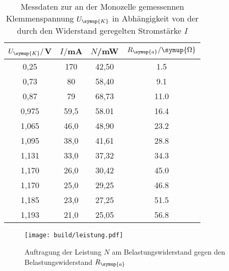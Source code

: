 \begin{table}
  \centering
  \caption{Messdaten zur an der Monozelle gemessennen Klemmenspannung $U_{\symup{K}}$
  in Abhängigkeit von der durch den Widerstand geregelten Stromstärke $I$}
  \label{tab:monozelle}
  \begin{tabular}{c c c c}
    \toprule
    $U_{\symup{K}}/$V & $I/$mA & $N$/mW & $R_{\symup{a}}/\symup{\Omega}$\\
    \midrule
    0,25	&  170 &   42,50  &  1.5\\
    0,73	&  80  &   58,40  &  9.1\\
    0,87	&  79  &   68,73  &  11.0\\
    0,975	& 59,5 &   58.01  &  16.4\\
    1,065	& 46,0 &   48,90  &  23.2\\
    1,095	& 38,0 &   41,61  &  28.8\\
    1,131	& 33,0 &   37,32  &  34.3\\
    1,170	& 26,0 &   30,42  &  45.0\\
    1,170	& 25,0 &   29,25  &  46.8\\
    1,185	& 23,0 &   27,25  &  51.5\\
    1,193	& 21,0 &   25,05  &  56.8\\
    \bottomrule
  \end{tabular}
\end{table}

\begin{figure}
  \centering
  \texttt{[image: build/leistung.pdf]}
  \caption{Auftragung der Leistung $N$ am Belastungswiderstand gegen den Belastungswiderstand
  $R_{\symup{a}}$}
  \label{fig:leistung}
\end{figure}
